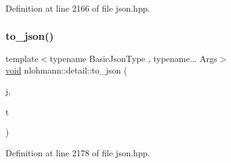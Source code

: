 Definition at line 2166 of file json.\+hpp.

\mbox{\label{namespacenlohmann_1_1detail_aa7a47b08eee864c2c108c04954919648}} 
\subsubsection{\texorpdfstring{to\_json()}{to\_json()}\hspace{0.1cm}{\footnotesize\ttfamily [17/17]}}
{\footnotesize\ttfamily template$<$typename Basic\+Json\+Type , typename... Args$>$ \\
\mbox{\hyperlink{namespacenlohmann_1_1detail_a59fca69799f6b9e366710cb9043aa77d}{void}} nlohmann\+::detail\+::to\+\_\+json (\begin{DoxyParamCaption}\item[{Basic\+Json\+Type \&}]{j,  }\item[{const std\+::tuple$<$ Args... $>$ \&}]{t }\end{DoxyParamCaption})}



Definition at line 2178 of file json.\+hpp.

